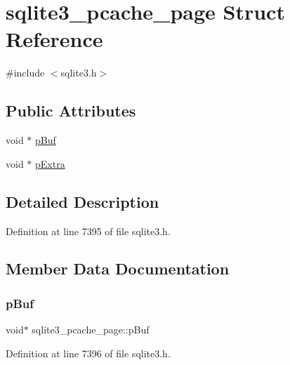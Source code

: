 \hypertarget{structsqlite3__pcache__page}{}\section{sqlite3\+\_\+pcache\+\_\+page Struct Reference}
\label{structsqlite3__pcache__page}


{\ttfamily \#include $<$sqlite3.\+h$>$}

\subsection*{Public Attributes}
\begin{DoxyCompactItemize}
\item 
void $\ast$ \mbox{\hyperlink{structsqlite3__pcache__page_a19aa6f5638fe2d4eee32aed37a119288}{p\+Buf}}
\item 
void $\ast$ \mbox{\hyperlink{structsqlite3__pcache__page_a6356a15fc426a7558ddf34038f70a65f}{p\+Extra}}
\end{DoxyCompactItemize}


\subsection{Detailed Description}


Definition at line 7395 of file sqlite3.\+h.



\subsection{Member Data Documentation}
\mbox{\label{structsqlite3__pcache__page_a19aa6f5638fe2d4eee32aed37a119288}} 
\subsubsection{\texorpdfstring{p\+Buf}{pBuf}}
{\footnotesize\ttfamily void$\ast$ sqlite3\+\_\+pcache\+\_\+page\+::p\+Buf}



Definition at line 7396 of file sqlite3.\+h.

\mbox{\label{structsqlite3__pcache__page_a6356a15fc426a7558ddf34038f70a65f}} 

